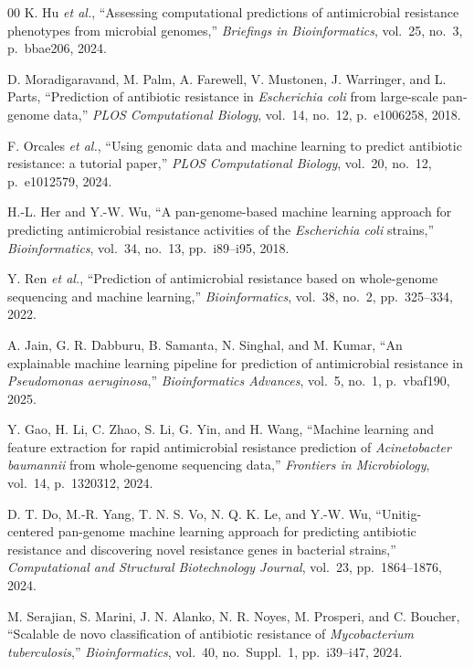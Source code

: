 \documentclass[journal]{IEEEtran}
\begin{document}
\begin{thebibliography}{00}
 K. Hu \textit{et al.}, ``Assessing computational predictions of antimicrobial resistance phenotypes from microbial genomes,'' \textit{Briefings in Bioinformatics}, vol.~25, no.~3, p.~bbae206, 2024.

 D. Moradigaravand, M. Palm, A. Farewell, V. Mustonen, J. Warringer, and L. Parts, ``Prediction of antibiotic resistance in \textit{Escherichia coli} from large-scale pan-genome data,'' \textit{PLOS Computational Biology}, vol.~14, no.~12, p.~e1006258, 2018.

 F. Orcales \textit{et al.}, ``Using genomic data and machine learning to predict antibiotic resistance: a tutorial paper,'' \textit{PLOS Computational Biology}, vol.~20, no.~12, p.~e1012579, 2024.

 H.-L. Her and Y.-W. Wu, ``A pan-genome-based machine learning approach for predicting antimicrobial resistance activities of the \textit{Escherichia coli} strains,'' \textit{Bioinformatics}, vol.~34, no.~13, pp.~i89--i95, 2018.

 Y. Ren \textit{et al.}, ``Prediction of antimicrobial resistance based on whole-genome sequencing and machine learning,'' \textit{Bioinformatics}, vol.~38, no.~2, pp.~325--334, 2022.

 A. Jain, G. R. Dabburu, B. Samanta, N. Singhal, and M. Kumar, ``An explainable machine learning pipeline for prediction of antimicrobial resistance in \textit{Pseudomonas aeruginosa},'' \textit{Bioinformatics Advances}, vol.~5, no.~1, p.~vbaf190, 2025.

 Y. Gao, H. Li, C. Zhao, S. Li, G. Yin, and H. Wang, ``Machine learning and feature extraction for rapid antimicrobial resistance prediction of \textit{Acinetobacter baumannii} from whole-genome sequencing data,'' \textit{Frontiers in Microbiology}, vol.~14, p.~1320312, 2024.

 D. T. Do, M.-R. Yang, T. N. S. Vo, N. Q. K. Le, and Y.-W. Wu, ``Unitig-centered pan-genome machine learning approach for predicting antibiotic resistance and discovering novel resistance genes in bacterial strains,'' \textit{Computational and Structural Biotechnology Journal}, vol.~23, pp.~1864--1876, 2024.

 M. Serajian, S. Marini, J. N. Alanko, N. R. Noyes, M. Prosperi, and C. Boucher, ``Scalable de novo classification of antibiotic resistance of \textit{Mycobacterium tuberculosis},'' \textit{Bioinformatics}, vol.~40, no.~Suppl.~1, pp.~i39--i47, 2024.


\end{thebibliography}
\end{document}
